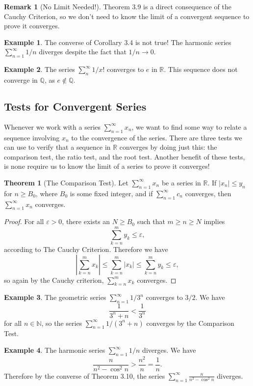 \documentclass{article}
\newcommand{\N}{\mathbb{N}}
\newcommand{\R}{\mathbb{R}}
\newcommand{\Q}{\mathbb{Q}}
\theoremstyle{definition}
\newtheorem{theorem}{Theorem}[section]
\newtheorem{example}{Example}[section]
\newtheorem{remark}{Remark}[section]
\begin{document}
	\begin{remark}[No Limit Needed!]
		Theorem 3.9 is a direct consequence of the Cauchy Criterion, so we don't need to know the limit of a convergent sequence to prove it converges. 
	\end{remark}
	\begin{example}
		The converse of Corollary 3.4 is not true! The harmonic series $ \sum_{n=1}^{\infty} 1/n$ diverges despite the fact that $ 1/n\to 0 $. 
	\end{example}
	
	
	\begin{example}
		The series $ \sum_{n}^{\infty}1/x! $ converges to $ e $ in $ \R $. This sequence does not converge in $ \Q $, as $ e\notin \Q $. 
	\end{example}
	\subsection{Tests for Convergent Series}
	Whenever we work with a series $ \sum_{n=1}^{\infty}x_n $, we want to find some way to relate a sequence involving $ x_n $ to the convergence of the series. There are three tests we can use to verify that a sequence in $ \R $ converges by doing just this: the comparison test, the ratio test, and the root test. Another benefit of these tests, is none require us to know the limit of a series to prove it converges! 
	\begin{theorem}[The Comparison Test]
		Let $ \sum_{n=1}^{\infty}x_n  $ be a series in $ \R $. If $ |x_n|\le y_n $ for $ n\ge B_0 $, where $ B_0 $ is some fixed integer, and if $ \sum_{n=1}^{\infty}c_n $ converges, then $ \sum_{n=1}^\infty x_n $ converges.
	\end{theorem}
	\begin{proof}
		For all $ \varepsilon>0 $, there exists an $ N\ge B_0 $ such that $ m\ge n\ge N $ implies $$ \sum_{k=n}^{m}y_k\le \varepsilon  ,$$ according to The Cauchy Criterion. Therefore we have $$ \left\lvert\sum_{k=n}^{m}x_k \right\rvert\le\sum_{k=n}^{m}|x_k|\le\sum_{k=n}^{m}y_k\le \varepsilon,  $$ so again by the Cauchy criterion, $\sum_{k=n}^{m}x_k  $ converges. 
	\end{proof}
	\begin{example}
		The geometric series $ \sum_{n=1}^{\infty}1/3^n $ converges to $ 3/2 $. We have $$\frac{1}{3^n+n}<\frac{1}{3^n} $$ for all $ n\in\N $, so the series $ \sum_{n=1}^{\infty}1/(3^n+n) $ converges by the Comparison Test.
	\end{example}
	\begin{example}
		The harmonic series $ \sum_{n=1}^{\infty}1/n  $ diverges. We have $$\frac{n}{n^2-\cos^2 n}>\frac{n^2}{n}=\frac{1}{n}.$$	Therefore by the converse of Theorem 3.10, the series $ \sum_{n=1}^{\infty}\frac{n}{n^2-\cos^2 n} $ diverges.
	\end{example}
	
\end{document}
